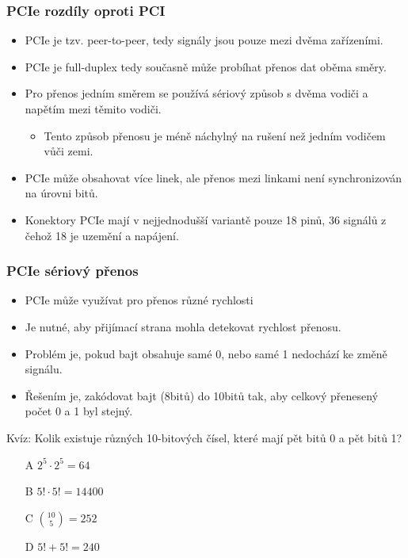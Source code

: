 \documentclass{beamer}
\begin{document}
\begin{frame}
\frametitle{PCIe rozdíly oproti PCI}

\begin{itemize}
\item PCIe je tzv. peer-to-peer, tedy signály jsou pouze mezi dvěma zařízeními.
\item PCIe je full-duplex tedy současně může probíhat přenos dat oběma směry.
\item Pro přenos jedním směrem se používá sériový způsob s dvěma vodiči a napětím mezi těmito vodiči.
\begin{itemize}
\item Tento způsob přenosu je méně náchylný na rušení než jedním vodičem vůči zemi.
\end{itemize}
\item PCIe může obsahovat více linek, ale přenos mezi linkami není synchronizován na úrovni bitů.
\item Konektory PCIe mají v nejjednodušší variantě pouze 18 pinů, 36 signálů z čehož 18 je uzemění a napájení.
\end{itemize}

\end{frame}

\begin{frame}
\frametitle{PCIe sériový přenos}

\begin{itemize}
\item PCIe může využívat pro přenos různé rychlosti
\item Je nutné, aby přijímací strana mohla detekovat rychlost přenosu.
\item Problém je, pokud bajt obsahuje samé 0, nebo samé 1 nedochází ke změně signálu.
\item Řešením je, zakódovat bajt (8bitů) do 10bitů tak, aby celkový přenesený počet 0 a 1 byl stejný.
\end{itemize}

Kvíz: Kolik existuje různých 10-bitových čísel, které mají pět bitů 0 a pět bitů 1?
\begin{itemize}
\item[A] $2^5 \cdot 2^5 = 64$
\item[B] $5! \cdot 5! = 14400$
\item[C] ${10 \choose 5} = 252$
\item[D] $5! + 5! = 240$
\end{itemize}
\end{frame}
\end{document}
